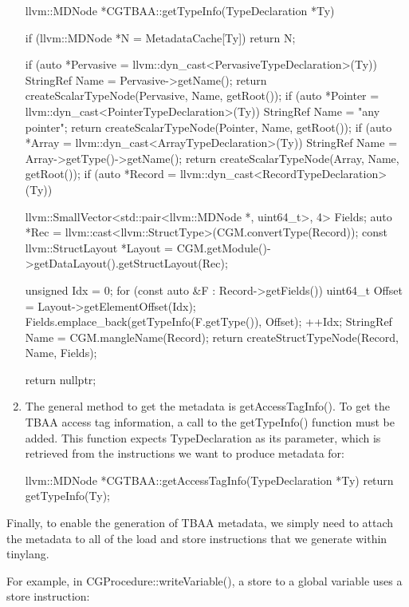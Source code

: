 \begin{enumerate}
\begin{cpp}
llvm::MDNode *CGTBAA::getTypeInfo(TypeDeclaration *Ty) {
    if (llvm::MDNode *N = MetadataCache[Ty])
        return N;

    if (auto *Pervasive =
            llvm::dyn_cast<PervasiveTypeDeclaration>(Ty)) {
        StringRef Name = Pervasive->getName();
        return createScalarTypeNode(Pervasive, Name, getRoot());
    }
    if (auto *Pointer =
            llvm::dyn_cast<PointerTypeDeclaration>(Ty)) {
        StringRef Name = "any pointer";
        return createScalarTypeNode(Pointer, Name, getRoot());
    }
    if (auto *Array =
            llvm::dyn_cast<ArrayTypeDeclaration>(Ty)) {
        StringRef Name = Array->getType()->getName();
        return createScalarTypeNode(Array, Name, getRoot());
    }
    if (auto *Record =
            llvm::dyn_cast<RecordTypeDeclaration>(Ty)) {
        llvm::SmallVector<std::pair<llvm::MDNode *, uint64_t>,
        4> Fields;
        auto *Rec =
            llvm::cast<llvm::StructType>(CGM.convertType(Record));
        const llvm::StructLayout *Layout =
        CGM.getModule()->getDataLayout().getStructLayout(Rec);

        unsigned Idx = 0;
        for (const auto &F : Record->getFields()) {
            uint64_t Offset = Layout->getElementOffset(Idx);
            Fields.emplace_back(getTypeInfo(F.getType()), Offset);
            ++Idx;
        }
        StringRef Name = CGM.mangleName(Record);
        return createStructTypeNode(Record, Name, Fields);
    }
    return nullptr;
}
\end{cpp}

\item
The general method to get the metadata is getAccessTagInfo(). To get the TBAA access tag information, a call to the getTypeInfo() function must be added. This function expects TypeDeclaration as its parameter, which is retrieved from the instructions we want to produce metadata for:

\begin{cpp}
llvm::MDNode *CGTBAA::getAccessTagInfo(TypeDeclaration *Ty) {
    return getTypeInfo(Ty);
}
\end{cpp}

\end{enumerate}

Finally, to enable the generation of TBAA metadata, we simply need to attach the metadata to all of the load and store instructions that we generate within tinylang.

For example, in CGProcedure::writeVariable(), a store to a global variable uses a store instruction:

